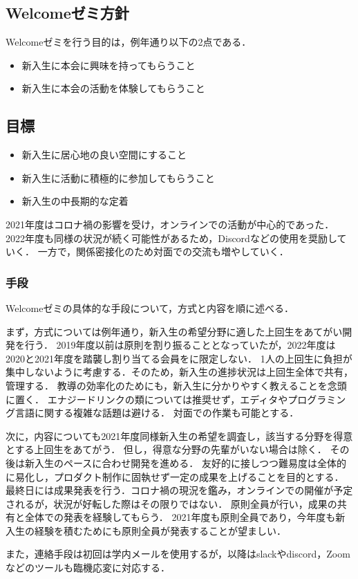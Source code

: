 \subsection*{Welcomeゼミ方針}



Welcomeゼミを行う目的は，例年通り以下の2点である．

\begin{itemize}
    \item 新入生に本会に興味を持ってもらうこと
    \item 新入生に本会の活動を体験してもらうこと
\end{itemize}

\subsection*{目標}
\begin{itemize}
    \item 新入生に居心地の良い空間にすること
    \item 新入生に活動に積極的に参加してもらうこと
    \item 新入生の中長期的な定着
\end{itemize}

2021年度はコロナ禍の影響を受け，オンラインでの活動が中心的であった．
2022年度も同様の状況が続く可能性があるため，Discordなどの使用を奨励していく．
一方で，関係密接化のため対面での交流も増やしていく．

\subsubsection*{手段}
Welcomeゼミの具体的な手段について，方式と内容を順に述べる．

まず，方式については例年通り，新入生の希望分野に適した上回生をあてがい開発を行う．
2019年度以前は原則\secondGrade{}を割り振ることとなっていたが，2022年度は2020と2021年度を踏襲し割り当てる会員を\secondGrade{}に限定しない．
1人の上回生に負担が集中しないように考慮する．そのため，新入生の進捗状況は上回生全体で共有，管理する．
教導の効率化のためにも，新入生に分かりやすく教えることを念頭に置く．
エナジードリンクの類については推奨せず，エディタやプログラミング言語に関する複雑な話題は避ける．
対面での作業も可能とする．

次に，内容についても2021年度同様新入生の希望を調査し，該当する分野を得意とする上回生をあてがう．
但し，得意な分野の先輩がいない場合は除く．
その後は新入生のペースに合わせ開発を進める．
友好的に接しつつ難易度は全体的に易化し，プロダクト制作に固執せず一定の成果を上げることを目的とする．
最終日には成果発表を行う．コロナ禍の現況を鑑み，オンラインでの開催が予定されるが，状況が好転した際はその限りではない．
原則全員が行い，成果の共有と全体での発表を経験してもらう．
2021年度も原則全員であり，今年度も新入生の経験を積むためにも原則全員が発表することが望ましい．

また，連絡手段は初回は学内メールを使用するが，以降はslackやdiscord，Zoomなどのツールも臨機応変に対応する．
